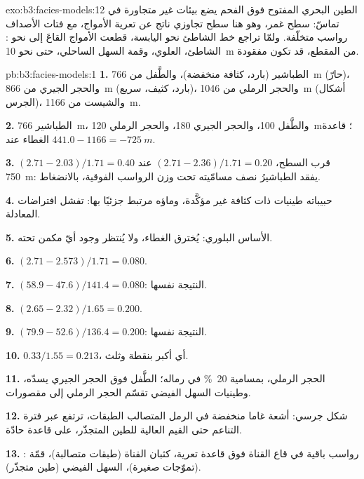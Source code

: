 \begin{solution}{exo:b3:facies-models:12}
الطين البحري المفتوح فوق الفحم يضع بيئات غير متجاورة في تماسّ: سطح
غمر، وهو هنا سطح تجاوزي ناتج عن تعرية الأمواج، مع فتات الأصداف
رواسب متخلّفة. ولمّا تراجع خط الشاطئ نحو اليابسة، قطعت الأمواج القاعَ
إلى نحو : الشاطئ،  العلوي،
وقمة السهل الساحلي، حتى نحو \qty{10}{m} من المقطع، قد تكون
مفقودة.
\end{solution}

\begin{solution}{pb:b3:facies-models:1}
\textbf{1.} الطباشير (بارد، كثافة منخفضة)، والطَّفل من \qty{766}{m} (حارّ)، والحجر الجيري من
\qty{866}{m} (بارد، كثيف، سريع)، والحجر الرملي من \qty{1046}{m} (أشكال
الجرس)، والشيست من \qty{1166}{m}.

\textbf{2.} الطباشير \qty{766}{m}، والطَّفل 100، والحجر الجيري 180، والحجر الرملي
\qty{120}{m}؛ قاعدة الغطاء عند $441.0 - 1166 = \qty{-725}{m}$.

\textbf{3.} $(2.71 - 2.03)/1.71 = 0.40$ قرب السطح، $(2.71 -
2.36)/1.71 = 0.20$ عند \qty{750}{m}: يفقد الطباشيرُ نصف مسامّيته
تحت وزن الرواسب الفوقية، بالانضغاط.

\textbf{4.} حبيباته طينيات ذات كثافة غير مؤكَّدة، وماؤه مرتبط
جزئيًا بها: تفشل افتراضات المعادلة.

\textbf{5.} الأساس البلوري: يُخترق الغطاء، ولا يُنتظر وجود
أيّ مكمن تحته.

\textbf{6.} $(2.71 - 2.573)/1.71 = 0.080$.

\textbf{7.} $(58.9 - 47.6)/141.4 = 0.080$: النتيجة نفسها.

\textbf{8.} $(2.65 - 2.32)/1.65 = 0.200$.

\textbf{9.} $(79.9 - 52.6)/136.4 = 0.200$: النتيجة نفسها.

\textbf{10.} $0.33/1.55 = 0.213$، أي أكبر بنقطة وثلث.

\textbf{11.} الحجر الرملي، بمسامية \qty{20}{\percent} في رماله؛
الطَّفل فوق الحجر الجيري يسدّه، وطينيات السهل الفيضي تقسّم
الحجر الرملي إلى مقصورات.

\textbf{12.} شكل جرسي: أشعة غاما منخفضة في الرمل المتصالب الطبقات، ترتفع عبر
فترة التناعم حتى القيم العالية للطين المتجذّر، على قاعدة حادّة.

\textbf{13.} : رواسب باقية في قاع القناة فوق قاعدة تعرية،
كثبان القناة (طبقات متصالبة)، قمّة  (تموّجات صغيرة)، السهل الفيضي
(طين متجذّر).


\end{solution}

